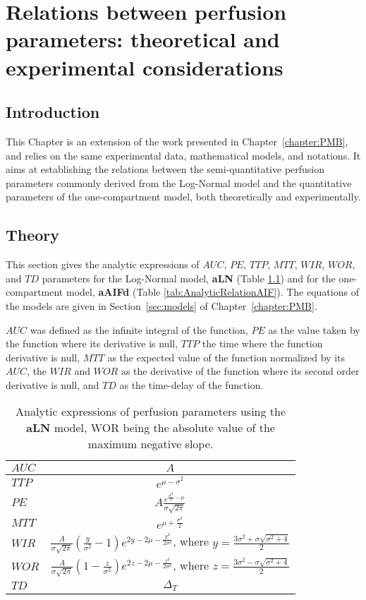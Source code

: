 \chapter{Relations between perfusion parameters: theoretical and experimental considerations}\label{chapter:PMB2}
\section{Introduction}
This Chapter is an extension of the work presented in Chapter~\ref{chapter:PMB}, and relies on the same experimental data, mathematical models, and notations.
It aims at establishing the relations between the semi-quantitative perfusion parameters commonly derived from the Log-Normal model and the quantitative parameters of the one-compartment model, both theoretically and experimentally.

\section{Theory}
This section gives the analytic expressions of $AUC$, $PE$, $TTP$, $MTT$, $WIR$, $WOR$, and $TD$ parameters for the Log-Normal model, \textbf{aLN} (Table \ref{tab:AnalyticRelation}) and for the one-compartment model, \textbf{aAIFd} (Table \ref{tab:AnalyticRelationAIF}).
The equations of the models are given in Section~\ref{sec:models} of Chapter~\ref{chapter:PMB}.

$AUC$ was defined as the infinite integral of the function, $PE$ as the value taken by the function where its derivative is null, $TTP$ the time where the function derivative is null, $MTT$ as the expected value of the function normalized by its $AUC$, the $WIR$ and $WOR$ as the derivative of the function where its second order derivative is null, and $TD$ as the time-delay of the function.

\begin{table}[!h]
\begin{center}
\begin{tabular}{lc}
\toprule
\textbf{$AUC$} & $A$ \\
\midrule
\textbf{$TTP$} & $e^{\mu - \sigma^2}$  \\
\midrule
\textbf{$PE$} & $A\frac{e^{\frac{\sigma^2}{2}-\mu}}{\sigma \sqrt{2\pi}}$  \\
\midrule
\textbf{$MTT$} & $e^{\mu + \frac{\sigma^2}{2}}$ \\
\midrule
\textbf{$WIR$}
 & $\frac{A}{\sigma\sqrt{2\pi}}\left(\frac{y}{\sigma^2}-1\right)e^{2y-2\mu-\frac{y^2}{2\sigma^2}}$, where $y = \frac{3\sigma^2+\sigma\sqrt{\sigma^2+4}}{2}$ \\
\midrule
\textbf{$WOR$} & $\frac{A}{\sigma\sqrt{2\pi}}\left(1-\frac{z}{\sigma^2}\right)e^{2z-2\mu-\frac{z^2}{2\sigma^2}}$, where $z = \frac{3\sigma^2-\sigma\sqrt{\sigma^2+4}}{2}$ \\
\midrule
\textbf{$TD$} & $\Delta_T$ \\
\bottomrule
\end{tabular}
\caption{Analytic expressions of perfusion parameters using the \textbf{aLN} model, WOR being the absolute value of the maximum negative slope.}
\label{tab:AnalyticRelation}
\end{center}
\end{table}

